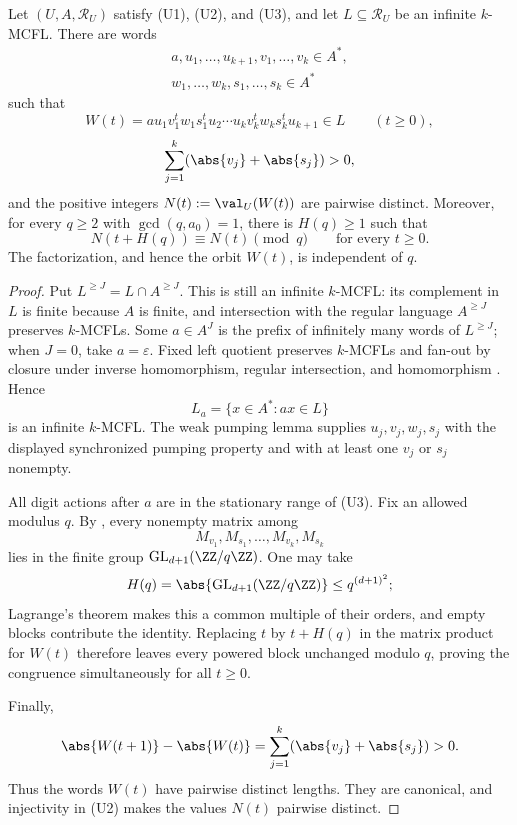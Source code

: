 \begin{theorem}
  \label{thm:mcfl-synchronized-congruence-orbit}
  Let \((U,A,\mathcal R_U)\) satisfy \textup{(U1)}, \textup{(U2)}, and
  \textup{(U3)}, and let
  \(L\subseteq\mathcal R_U\) be an infinite \(k\)-MCFL. There are words
  \[
    \begin{gathered}
      a,u_1,\ldots,u_{k+1},v_1,\ldots,v_k\in A^\ast,\\
      w_1,\ldots,w_k,s_1,\ldots,s_k\in A^\ast
    \end{gathered}
  \]
  such that
  \[
    W(t)=a u_1v_1^tw_1s_1^tu_2\cdots
          u_kv_k^tw_ks_k^tu_{k+1}\in L
          \qquad(t\ge0),
  \]
  \[
    \sum_{j=1}^k(\abs{v_j}+\abs{s_j})>0,
  \]
  and the positive integers \(N(t):=\val_U(W(t))\) are pairwise distinct.
  Moreover, for
  every \(q\ge2\) with \(\gcd(q,a_0)=1\), there is \(H(q)\ge1\) such
  that
  \[
    N(t+H(q))\equiv N(t)\pmod q
    \qquad\text{for every }t\ge0.
  \]
  The factorization, and hence the orbit \(W(t)\), is independent of
  \(q\).
\end{theorem}

\begin{proof}
  Put \(L^{\ge J}=L\cap A^{\ge J}\). This is still an infinite
  \(k\)-MCFL: its complement in \(L\) is finite because \(A\) is finite,
  and intersection with the regular language \(A^{\ge J}\) preserves
  \(k\)-MCFLs. Some \(a\in A^J\) is the prefix of infinitely many words
  of \(L^{\ge J}\); when \(J=0\), take \(a=\varepsilon\). Fixed left
  quotient preserves \(k\)-MCFLs and fan-out by closure under inverse
  homomorphism, regular intersection, and homomorphism
  \cite[Proposition~2.3]{DuncanElderFrenkelLiu2026}. Hence
  \[
    L_a=\{x\in A^\ast:ax\in L\}
  \]
  is an infinite \(k\)-MCFL. The weak pumping lemma supplies
  \(u_j,v_j,w_j,s_j\) with the displayed synchronized pumping property
  and with at least one \(v_j\) or \(s_j\) nonempty.

  All digit actions after \(a\) are in the stationary range of
  \textup{(U3)}. Fix an allowed modulus \(q\). By
  , every nonempty matrix among
  \[
    M_{v_1},M_{s_1},\ldots,M_{v_k},M_{s_k}
  \]
  lies in the finite group
  \(\operatorname{GL}_{d+1}(\ZZ/q\ZZ)\). One may take
  \[
    H(q)=\abs{\operatorname{GL}_{d+1}(\ZZ/q\ZZ)}
      \le q^{(d+1)^2};
  \]
  Lagrange's theorem makes this a common multiple of their orders, and
  empty blocks contribute the identity.
  Replacing \(t\) by \(t+H(q)\) in the matrix product for \(W(t)\)
  therefore leaves every powered block unchanged modulo \(q\), proving
  the congruence simultaneously for all \(t\ge0\).

  Finally,
  \[
    \abs{W(t+1)}-\abs{W(t)}
      =\sum_{j=1}^k(\abs{v_j}+\abs{s_j})>0.
  \]
  Thus the words \(W(t)\) have pairwise distinct lengths. They are
  canonical, and injectivity in \textup{(U2)} makes the values \(N(t)\)
  pairwise distinct.
\end{proof}

